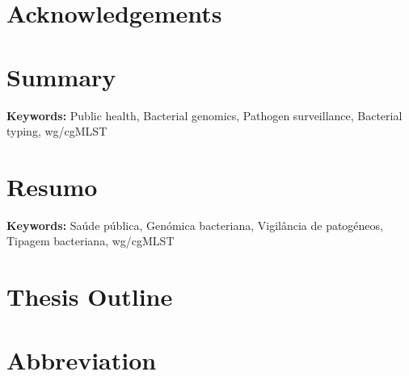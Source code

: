 \documentclass[12pt,a4paper,twoside,openright]{book}
\providecommand{\keywords}[1]{\textbf{Keywords:} #1}
\begin{document}
\begin{sloppy}
\chapter*{Acknowledgements}

\clearpage \thispagestyle{empty}\mbox{}\clearpage

\newpage
\thispagestyle{plain}
\chapter*{Summary}


\keywords{Public health, Bacterial genomics, Pathogen surveillance, Bacterial typing, wg/cgMLST}
\clearpage \thispagestyle{empty}\mbox{}\clearpage

\newpage
\thispagestyle{plain}
\chapter*{Resumo}


\keywords{Saúde pública, Genómica bacteriana, Vigilância de patogéneos, Tipagem bacteriana, wg/cgMLST}
\clearpage \thispagestyle{empty}\mbox{}\clearpage

\newpage
\thispagestyle{plain}
\chapter*{Thesis Outline}

\clearpage \thispagestyle{empty}\mbox{}\clearpage

\newpage
\thispagestyle{plain}
\chapter*{Abbreviation}

\clearpage \thispagestyle{empty}\mbox{}\clearpage


\end{sloppy}
\end{document}
